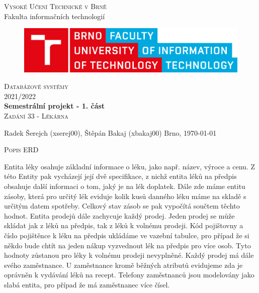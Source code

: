\documentclass[12pt,paper=a4]{article}
\begin{document}

	\begin{titlepage}
		\begin{center}
			\textsc{\LARGE Vysoké Učení Technické v Brně} \\[0.5cm]
			{\LARGE Fakulta informačních technologií}

			\begin{figure}[H]
				\center\includegraphics[width=0.5\linewidth]{obr/logo.pdf}
			\end{figure}

			\vspace{3cm}

			\textsc{\LARGE Databázové systémy } \\[0.5cm]
			\textsc{\LARGE 2021/2022} \\[3.5cm]

			\textbf{{\LARGE Semestrální projekt - 1. část}} \\
			\textsc{{\LARGE Zadání 33 - Lékárna}}
		\end{center}
		\vfill
		\begin{flushleft} 
			\large
			Radek Šerejch (xserej00),
			Štěpán Bakaj (xbakaj00)
			\hfill
			Brno, \today
		\end{flushleft}
	\end{titlepage}

	\newpage
	\begin{center}
		\textsc{\LARGE Popis ERD } \\[0.5cm]
	\end{center}
	
	
		Entita léky osahuje základní informace o léku, jako např. název, výroce a cenu. Z této Entity pak vycházejí její dvě specifikace, z nichž entita léků na předpis obsahuje další informaci o tom, jaký je na lék doplatek. Dále zde máme entitu zásoby, která pro určitý lék eviduje kolik kusů danného léku máme na skladě s určitým datem spotřeby. Celkový stav zásob se pak vypočítá součtem těchto hodnot. Entita prodejů dále zachycuje každý prodej. Jeden prodej se může skládat jak z léků na předpis, tak z léků k volnému prodeji. Kód pojištovny a číslo pojištěnce k léku na předpis ukládáme ve vazební tabulce, pro případ že si někdo bude chtít na jeden nákup vyzvednout lék na předpis pro více osob. Tyto hodnoty zůstanou pro léky k volnému prodeji nevyplněné. Každý prodej má dále svého zaměstnance. U zaměstnance kromě běžných atributů evidujeme zda je oprávněn k vydávání léků na recept. Telefony zaměstnanců jsou modelovány jako slabá entita, pro případ že má zaměstnanec více čísel.
	
	\newpage

	\newpage
\end{document}
